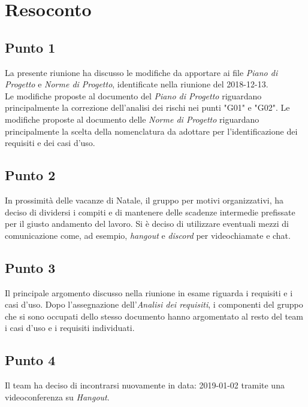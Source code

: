 \section{Resoconto}

\subsection{Punto 1}
La presente riunione ha discusso le modifiche da apportare ai file \textit{Piano di Progetto} e \textit{Norme di Progetto}, identificate nella riunione del 2018-12-13.\\
Le modifiche proposte al documento del \textit{Piano di Progetto} riguardano principalmente la correzione dell'analisi dei rischi nei punti "G01" e "G02". 
Le modifiche proposte al documento delle \textit{Norme di Progetto} riguardano principalmente la scelta della nomenclatura da adottare per l'identificazione dei requisiti e dei casi d'uso.

\subsection{Punto 2}
In prossimità delle vacanze di Natale, il gruppo per motivi organizzativi, ha deciso di dividersi i compiti e di mantenere delle scadenze intermedie prefissate per il giusto andamento del lavoro. Si è deciso di utilizzare eventuali mezzi di comunicazione come, ad esempio, \textit{hangout} e \textit{discord} per videochiamate e chat.

\subsection{Punto 3}
Il principale argomento discusso nella riunione in esame riguarda i requisiti e i casi d'uso. Dopo l'assegnazione dell'\textit{Analisi dei requisiti}, i componenti del gruppo che si sono occupati dello stesso documento hanno argomentato al resto del team i casi d'uso e i requisiti individuati.

\subsection{Punto 4}
Il team ha deciso di incontrarsi nuovamente in data: 2019-01-02 tramite una videoconferenza su \textit{Hangout}.
